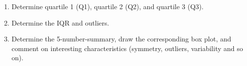 \documentclass[letterpaper,12pt]{article}
\begin{document}
\begin{enumerate}
\begin{enumerate}
\begin{align*}
{\begin{array}{l}
              56, 57, 57, 57, 58, 58, 58, 58, 59, 59, 59, 59, 59, 59, 59, 59, 59, \\
              60, 60, 60, 60, 60, 61, 61, 61, 62, 62, 62, 62, 62, 62, 62, 63, 63, \\
              63, 63, 63, 64, 64, 64, 64, 64, 65, 65, 65, 65, 65, 66, 66, 66, 66, \\
              66, 66, 67, 67, 67, 67, 67, 68, 68, 68, 68, 69, 69, 69, 70, 70, 70, \\
              70, 71, 71, 72, 72, 72, 72, 72, 72, 72, 73, 73, 73, 73, 73, 73, 73, \\
              73, 73, 74, 74, 74, 74, 74, 74, 74, 75, 75, 76, 76, 76, 76, 76, 76, \\
              77, 77, 77, 77, 77, 78, 78, 79, 79, 80, 80, 80, 80, 81, 81, 81, 82, \\
              82, 82, 82, 82, 84, 84, 84, 84, 84, 85, 85, 85, 85, 85, 86, 86, 86, \\
              87, 87, 87, 87, 87
            \end{array}\right\}
          } \\
          \eqobservations{B}{362}{2}{x - \Set{24, 25, 25}} \\
          \eqobservations{C}{365}{3}{x}
        \end{align*}
      \item[6.]
        Determine quartile 1 (Q1), quartile 2 (Q2), and quartile 3 (Q3).
      \item[7.]
        Determine the IQR and outliers.
      \item[8.]
        Determine the 5-number-summary, draw the corresponding box plot, and comment on interesting characteristics (symmetry, outliers, variability and so on).
    \end{enumerate}
\end{enumerate}
\end{document}
